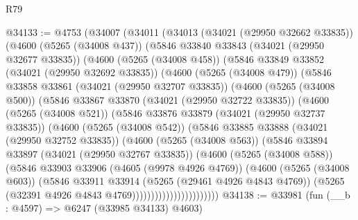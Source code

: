 \begin{lexlean}{R79}
\begin{coremodule}
@34133 := @4753
    (@34007
      (@34011
        (@34013
          (@34021 (@29950 @32662 @33835))
          (@4600
            (@5265 (@34008 @437))
            (@5846
              @33840
              @33843
              (@34021 (@29950 @32677 @33835))
              (@4600
                (@5265 (@34008 @458))
                (@5846
                  @33849
                  @33852
                  (@34021 (@29950 @32692 @33835))
                  (@4600
                    (@5265 (@34008 @479))
                    (@5846
                      @33858
                      @33861
                      (@34021 (@29950 @32707 @33835))
                      (@4600
                        (@5265 (@34008 @500))
                        (@5846
                          @33867
                          @33870
                          (@34021 (@29950 @32722 @33835))
                          (@4600
                            (@5265 (@34008 @521))
                            (@5846
                              @33876
                              @33879
                              (@34021 (@29950 @32737 @33835))
                              (@4600
                                (@5265 (@34008 @542))
                                (@5846
                                  @33885
                                  @33888
                                  (@34021 (@29950 @32752 @33835))
                                  (@4600
                                    (@5265 (@34008 @563))
                                    (@5846
                                      @33894
                                      @33897
                                      (@34021 (@29950 @32767 @33835))
                                      (@4600
                                        (@5265 (@34008 @588))
                                        (@5846
                                          @33903
                                          @33906
                                          (@4605 (@9978 @4926 @4769))
                                          (@4600
                                            (@5265 (@34008 @603))
                                            (@5846
                                              @33911
                                              @33914
                                              (@5265 (@29461 @4926 @4843 @4769))
                                              (@5265
                                                (@32391 @4926 @4843 @4769)))))))))))))))))))))))
@34138 := @33981 (fun (__b : @4597) => @6247 (@33985 @34133) @4603)

\end{coremodule}
\end{lexlean}
